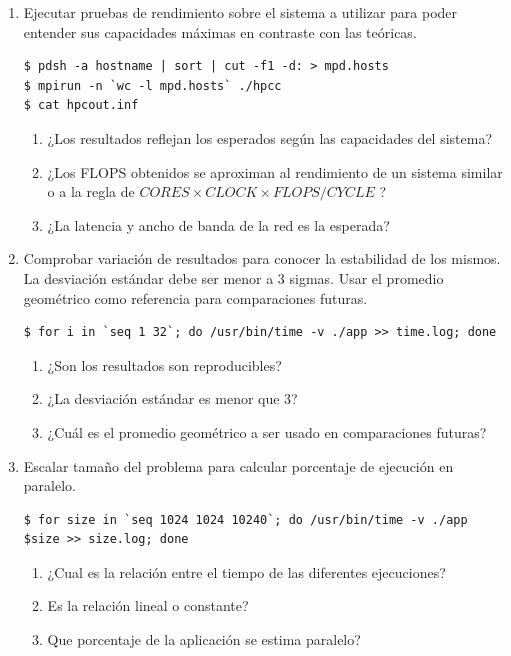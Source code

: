 \documentclass[a4paper]{report}
\begin{document}
\begin{enumerate}
\item Ejecutar pruebas de rendimiento sobre el sistema a utilizar para poder entender sus capacidades máximas en contraste con las teóricas.

\begin{lstlisting}
$ pdsh -a hostname | sort | cut -f1 -d: > mpd.hosts
$ mpirun -n `wc -l mpd.hosts` ./hpcc
$ cat hpcout.inf
\end{lstlisting}

\begin{enumerate}
\item ¿Los resultados reflejan los esperados según las capacidades del sistema?
\item ¿Los FLOPS obtenidos se aproximan al rendimiento de un sistema similar o a la regla de $ CORES \times CLOCK \times FLOPS/CYCLE $ ?
\item ¿La latencia y ancho de banda de la red es la esperada?
\end{enumerate}

\item Comprobar variación de resultados para conocer la estabilidad de los mismos. La desviación estándar debe ser menor a 3 sigmas. Usar el promedio geométrico como referencia para comparaciones futuras.

\begin{lstlisting}
$ for i in `seq 1 32`; do /usr/bin/time -v ./app >> time.log; done
\end{lstlisting}

\begin{enumerate}
\item ¿Son los resultados son reproducibles?
\item ¿La desviación estándar es menor que 3?
\item ¿Cuál es el promedio geométrico a ser usado en comparaciones futuras?
\end{enumerate}

\item Escalar tamaño del problema para calcular porcentaje de ejecución en paralelo.

\begin{lstlisting}
$ for size in `seq 1024 1024 10240`; do /usr/bin/time -v ./app $size >> size.log; done
\end{lstlisting}

\begin{enumerate}
\item ¿Cual es la relación entre el tiempo de las diferentes ejecuciones?
\item Es la relación lineal o constante?
\item Que porcentaje de la aplicación se estima paralelo?
\end{enumerate}


\end{enumerate}
\end{document}
